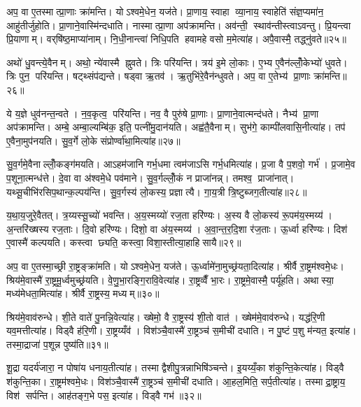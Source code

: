 अप॒ वा ए॒तस्मात्प्रा॒णाः क्रा॑मन्ति। योऽश्वमे॒धेन॒ यज॑ते। प्रा॒णाय॒ स्वाहा व्या॒नाय॒ स्वाहेति॑ संज्ञ॒प्यमा॑न॒ आहु॑तीर्जुहोति। प्रा॒णाने॒वास्मि॑न्दधाति। नास्मात्प्रा॒णा अप॑क्रामन्ति। अव॑न्ती॒ स्थाव॑न्तीस्त्वाऽवन्तु। प्रि॒यन्त्वा प्रि॒याणाम्। वर्‌षि॑ष्ठ॒माप्या॑नाम्। नि॒धी॒नान्त्वा॑ निधि॒पति हवामहे वसो म॒मेत्या॑ह। अपै॒वास्मै॒ तद्ध्नु॑वते॥२५॥

अथो॑ धु॒वन्त्ये॒वैनम्। अथो॒ न्ये॑वास्मै ह्नुवते। त्रिः परि॑यन्ति। त्रय॑ इ॒मे लो॒काः। ए॒भ्य ए॒वैन॑ल्लोँ॒केभ्यो॑ धुवते। त्रिः पुन॒ परि॑यन्ति। षट्थ्संप॑द्यन्ते। षड्वा ऋ॒तव॑। ऋ॒तुभि॑रे॒वैन॑न्धुवते। अप॒ वा ए॒तेभ्य॑ प्रा॒णाः क्रा॑मन्ति॥२६॥

ये य॒ज्ञे धुव॑नन्त॒न्वते। न॒व॒कृत्व॒ परि॑यन्ति। नव॒ वै पुरु॑षे प्रा॒णाः। प्रा॒णाने॒वात्मन्द॑धते। नैभ्य॑ प्रा॒णा अप॑क्रामन्ति। अम्बे॒ अम्बा॒ल्यम्बि॑क॒ इति॒ पत्नी॑मु॒दान॑यति। अह्व॑तै॒वैनाम्। सुभ॑गे॒ काम्पी॑लवासि॒नीत्या॑ह। तप॑ ए॒वैना॒मुप॑नयति। सु॒व॒र्गे लो॒के संप्रोर्ण्वा॑था॒मित्या॑ह॥२७॥

सु॒व॒र्गमे॒वैनाल्लोँ॒कङ्ग॑मयति। आऽहम॑जानि गर्भ॒धमा त्वम॑जाऽसि गर्भ॒धमित्या॑ह। प्र॒जा वै प॒शवो॒ गर्भ॑। प्र॒जामे॒व प॒शूना॒त्मन्ध॑त्ते। दे॒वा वा अ॑श्वमे॒धे पव॑माने। सु॒व॒र्गल्लोँ॒कं न प्राजा॑नन्न्। तमश्व॒ प्राजा॑नात्। यथ्सू॒चीभि॑रसिप॒थान्क॒ल्पय॑न्ति। सु॒व॒र्गस्य॑ लो॒कस्य॒ प्रज्ञात्यै। गा॒य॒त्री त्रि॒ष्टुब्जग॒तीत्या॑ह॥२८॥

य॒था॒य॒जुरे॒वैतत्। त्र॒य्यस्सू॒च्यो॑ भवन्ति। अ॒य॒स्मय्यो॑ रज॒ता हरि॑ण्यः। अ॒स्य वै लो॒कस्य॑ रू॒पम॑य॒स्मय्य॑। अ॒न्तरि॑ख्षस्य रज॒ताः। दि॒वो हरि॑ण्यः। दिशो॒ वा अ॑य॒स्मय्य॑। अ॒वा॒न्त॒र॒दि॒शा र॑ज॒ताः। ऊ॒र्ध्वा हरि॑ण्यः। दिश॑ ए॒वास्मै॑ कल्पयति। कस्त्वा छ्यति॒ कस्त्वा॒ विशा॒स्तीत्या॒हाहिसायै॥२९॥\anuvakamend[ह्नु॒व॒ते॒ क्रा॒म॒न्त्यू॒र्ण्वा॒था॒मित्या॑ह॒ जग॒तीत्या॑ह कल्पय॒त्येक॑ञ्च]

अप॒ वा ए॒तस्मा॒च्छ्री रा॒ष्ट्रङ्क्रा॑मति। योऽश्वमे॒धेन॒ यज॑ते। ऊ॒र्ध्वामे॑ना॒मुच्छ्र॑यता॒दित्या॑ह। श्रीर्वै रा॒ष्ट्रम॑श्वमे॒धः। श्रिय॑मे॒वास्मै॑ रा॒ष्ट्रमू॒र्ध्वमुच्छ्र॑यति। वे॒णु॒भा॒रङ्गि॒रावि॒वेत्या॑ह। रा॒ष्ट्रव्वैँ भा॒रः। रा॒ष्ट्रमे॒वास्मै॒ पर्यू॑हति। अथास्या॒ मध्य॑मेधता॒मित्या॑ह। श्रीर्वै रा॒ष्ट्रस्य॒ मध्यम्॥३०॥

श्रिय॑मे॒वाव॑रुन्धे। शी॒ते वाते॑ पु॒नन्नि॒वेत्या॑ह। ख्षेमो॒ वै रा॒ष्ट्रस्य॑ शी॒तो वात॑। ख्षेम॑मे॒वाव॑रुन्धे। यद्ध॑रि॒णी यव॒मत्तीत्या॑ह। विड्वै ह॑रि॒णी। रा॒ष्ट्रय्यँव॑। विश॑ञ्चै॒वास्मै॑ रा॒ष्ट्रञ्च॑ स॒मीची॑ दधाति। न पु॒ष्टं प॒शु म॑न्यत॒ इत्या॑ह। तस्मा॒द्राजा॑ प॒शून्न पुष्य॑ति॥३१॥

शू॒द्रा यदर्य॑जारा॒ न पोषा॑य धनाय॒तीत्या॑ह। तस्माद्वैशीपु॒त्रन्नाभिषि॑ञ्चन्ते। इ॒यय्यँ॒का श॑कुन्ति॒केत्या॑ह। विड्वै श॑कुन्ति॒का। रा॒ष्ट्रम॑श्वमे॒धः। विश॑ञ्चै॒वास्मै॑ रा॒ष्ट्रञ्च॑ स॒मीची॑ दधाति। आ॒हल॒मिति॒ सर्प॒तीत्या॑ह। तस्माद्रा॒ष्ट्राय॒ विश॑ सर्पन्ति। आह॑तङ्ग॒भे पस॒ इत्या॑ह। विड्वै गभ॑॥३२॥

